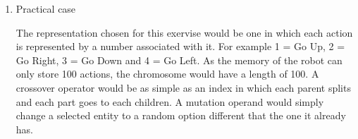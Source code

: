 \documentclass{article}
\begin{document}
\begin{enumerate}
\begin{itemize}
        \pagebreak

        \item Given a population of five chromosomes: 100, 001, 111, 010, and 000, how many different schemata exist in such a population?  As part of your answer, calculate the lower and upper bounds of schemata in the population.\\
        Upper bound = $5*2^3 = 40$ \\
        Lower bound = $2^3 = 8$\\
        \begin{multicols}{4}
            \begin{itemize}
                \item 000
                \item 00*
                \item 0*0
                \item *00
                \item 0**
                \item **0
                \item *0*
                \item ***
                \item 010
                \item 01*
                \item *10
                \item *1*
                \item 111
                \item 11*
                \item 1*1
                \item *11
                \item 1**
                \item **1
                \item 001
                \item 0*1
                \item *01
                \item 100
                \item 10*
                \item 1*0
            \end{itemize}
        \end{multicols}
    \end{itemize}

    \item Practical case

    The representation chosen for this exervise would be one in which each action is represented by a number associated with it. For example 1 = Go Up, 2 = Go Right, 3 = Go Down and 4 = Go Left. As the memory of the robot can only store 100 actions, the chromosome would have a length of 100. A crossover operator would be as simple as an index in which each parent splits and each part goes to each children. A mutation operand would simply change a selected entity to a random option different that the one it already has.


\end{enumerate}
\end{document}
